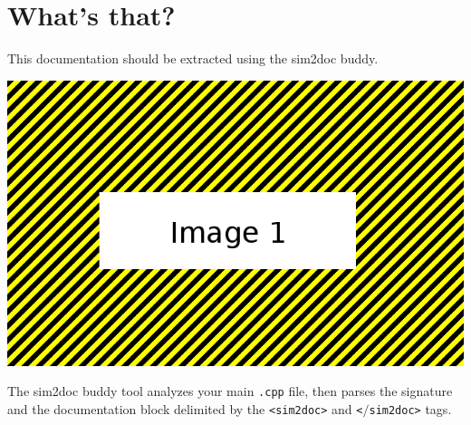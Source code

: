 \section{What's that?}

This documentation should be extracted using the sim2doc buddy.\\

\begin{center}
\includegraphics[scale=0.2]{doc/images/image1.png}
\end{center}

The sim2doc buddy tool analyzes your main \texttt{.cpp} file,
then parses the signature
and the documentation block delimited by the \texttt{<sim2doc>} and \texttt{<$/$sim2doc>} tags.



